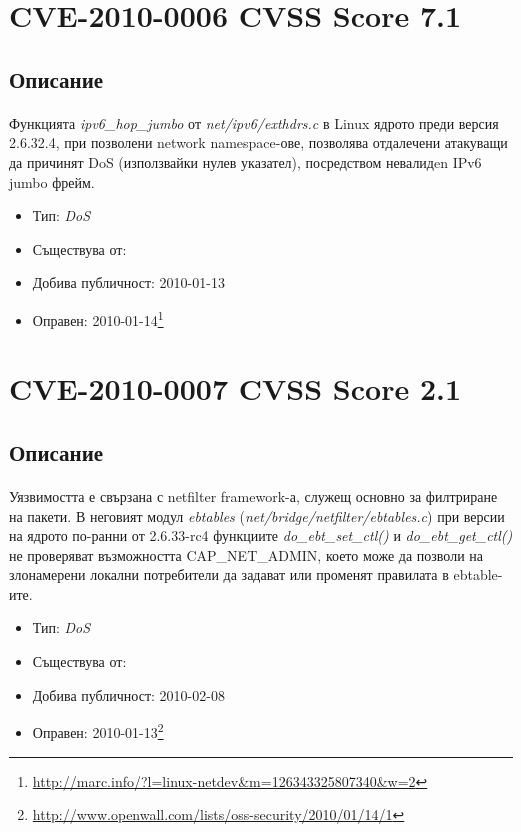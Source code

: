 \documentclass[a4paper,12pt,leqno]{article}
\begin{document}
\section{CVE-2010-0006 CVSS Score 7.1}
\subsection{Описание}
\paragraph{}
Функцията \textit{ipv6\_hop\_jumbo} от \textit{net/ipv6/exthdrs.c} в Linux ядрото преди версия 
2.6.32.4, при  позволени network namespace-ове, позволява отдалечени 
атакуващи да причинят DoS (използвайки нулев указател), посредством 
невалидen IPv6 jumbo фрейм.

\begin{itemize}
    \item Тип: \textit{DoS}
    \item Съществува от:
  	\item Добива публичност: 2010-01-13
    \item Оправен: 2010-01-14\footnote{\url{http://marc.info/?l=linux-netdev&m=126343325807340&w=2}}
\end{itemize}

\section{CVE-2010-0007 CVSS Score 2.1}
\subsection{Описание}
\paragraph{}
Уязвимостта е свързана с netfilter framework-а, служещ основно за филтриране 
на пакети. В неговият модул \textit{ebtables} (\textit{net/bridge/netfilter/ebtables.c}) при версии 
на ядрото по-ранни от 2.6.33-rc4 функциите \textit{do\_ebt\_set\_ctl()} и 
\textit{do\_ebt\_get\_ctl()} не проверяват възможността CAP\_NET\_ADMIN, което може 
да позволи на злонамерени локални потребители да задават или променят 
правилата в ebtable-ите.
\begin{itemize}
    \item Тип: \textit{DoS}
    \item Съществува от:
  	\item Добива публичност: 2010-02-08
    \item Оправен: 2010-01-13\footnote{\url{http://www.openwall.com/lists/oss-security/2010/01/14/1}}
\end{itemize}
\end{document}
